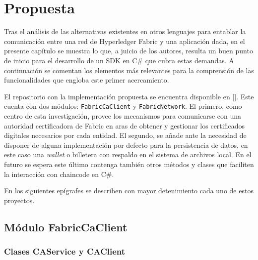 \chapter{Propuesta}\label{chapter:proposal}


Tras el an\'alisis de las alternativas existentes en otros lenguajes para entablar la comunicaci\'on entre una red de Hyperledger Fabric y una aplicaci\'on dada, en el presente cap\'itulo se muestra lo que, a juicio de los autores, resulta un buen punto de inicio para el desarrollo de un SDK en C\# que cubra estas demandas. A continuaci\'on se comentan los elementos m\'as relevantes para la comprensi\'on de las funcionalidades que engloba este primer acercamiento.

El repositorio con la implementaci\'on propuesta se encuentra disponible en [\cite{hfsdkcsharp}]. Este cuenta con dos m\'odulos: \texttt{FabricCaClient} y \texttt{FabricNetwork}. El primero, como centro de esta investigaci\'on, provee los mecanismos para comunicarse con una autoridad certificadora de Fabric en aras de obtener y gestionar los certificados digitales necesarios por cada entidad. El segundo, se añade ante la necesidad de disponer de alguna implementaci\'on por defecto para la persistencia de datos, en este caso una \emph{wallet} o billetera con respaldo en el sistema de archivos local. En  el futuro se espera este \'ultimo contenga tambi\'en otros m\'etodos y clases que faciliten la interacci\'on con chaincode en C\#.

En los siguientes ep\'igrafes se describen con mayor detenimiento cada uno de estos proyectos.


\section{M\'odulo FabricCaClient}

\subsection{Clases CAService y CAClient}

